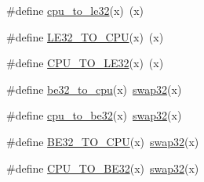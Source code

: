 \begin{DoxyCompactItemize}
\item 
\#define \mbox{\hyperlink{group__group__sam0__utils_ga1d5ae0c36d519a1b0a789db69a598f28}{cpu\+\_\+to\+\_\+le32}}(x)~(x)
\item 
\#define \mbox{\hyperlink{group__group__sam0__utils_ga488a93b151ee4920c0a117fe66cc2efb}{L\+E32\+\_\+\+T\+O\+\_\+\+C\+PU}}(x)~(x)
\item 
\#define \mbox{\hyperlink{group__group__sam0__utils_gac904d01eec66efc89dba5a687749d5f5}{C\+P\+U\+\_\+\+T\+O\+\_\+\+L\+E32}}(x)~(x)
\item 
\#define \mbox{\hyperlink{group__group__sam0__utils_ga650ecb20996a13e0c0bc530ba83fe5dc}{be32\+\_\+to\+\_\+cpu}}(x)~\mbox{\hyperlink{group__group__sam0__utils_ga46025d8a12ccc9f4268c84e56c457416}{swap32}}(x)
\item 
\#define \mbox{\hyperlink{group__group__sam0__utils_gafd3274bb70aea7cf9be403940e001cc7}{cpu\+\_\+to\+\_\+be32}}(x)~\mbox{\hyperlink{group__group__sam0__utils_ga46025d8a12ccc9f4268c84e56c457416}{swap32}}(x)
\item 
\#define \mbox{\hyperlink{group__group__sam0__utils_gad6fd2e5e0a54fb6300fe98868141175e}{B\+E32\+\_\+\+T\+O\+\_\+\+C\+PU}}(x)~\mbox{\hyperlink{group__group__sam0__utils_ga46025d8a12ccc9f4268c84e56c457416}{swap32}}(x)
\item 
\#define \mbox{\hyperlink{group__group__sam0__utils_gabe5b68e77b7f6870895076278368d201}{C\+P\+U\+\_\+\+T\+O\+\_\+\+B\+E32}}(x)~\mbox{\hyperlink{group__group__sam0__utils_ga46025d8a12ccc9f4268c84e56c457416}{swap32}}(x)
\end{DoxyCompactItemize}

